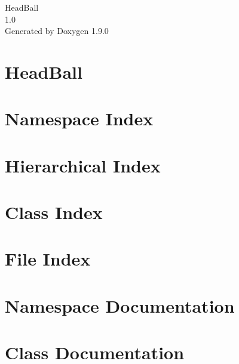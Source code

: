 \let\mypdfximage\pdfximage\def\pdfximage{\immediate\mypdfximage}\documentclass[twoside]{book}
\newcommand{\+}{\discretionary{\mbox{\scriptsize$\hookleftarrow$}}{}{}}
\newcommand{\clearemptydoublepage}{%
  \newpage{\pagestyle{empty}\cleardoublepage}%
}
\begin{document}
\raggedbottom

\hypersetup{pageanchor=false,
             bookmarksnumbered=true,
             pdfencoding=unicode
            }
\begin{titlepage}
\vspace*{7cm}
\begin{center}%
{\Large Head\+Ball \\[1ex]\large 1.\+0 }\\
\vspace*{1cm}
{\large Generated by Doxygen 1.9.0}\\
\end{center}
\end{titlepage}
\clearemptydoublepage
{}
\tableofcontents
\clearemptydoublepage
{}
\hypersetup{pageanchor=true}

\chapter{Head\+Ball}
\label{index}\hypertarget{index}{}
\chapter{Namespace Index}

\chapter{Hierarchical Index}

\chapter{Class Index}

\chapter{File Index}

\chapter{Namespace Documentation}


\chapter{Class Documentation}























\end{document}
